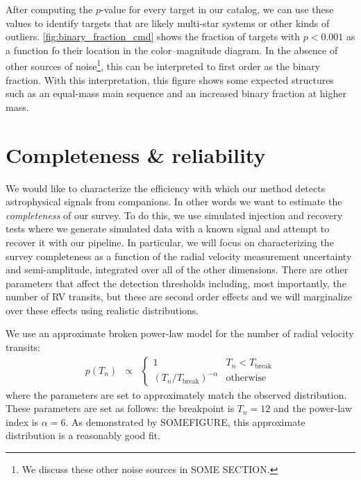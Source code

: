 \documentclass[modern, letterpaper]{aastex631}
\newcommand{\project}[1]{\textsl{#1}}
\newcommand{\Gaia}{\project{Gaia}}
\begin{document}
After computing the $p$-value for every target in our catalog, we can use these values to identify targets that are likely multi-star systems or other kinds of outliers.
\autoref{fig:binary_fraction_cmd} shows the fraction of targets with $p < 0.001$ as a function fo their location in the color--magnitude diagram.
In the absence of other sources of noise\footnote{We discuss these other noise sources in SOME SECTION.}, this can be interpreted to first order as the binary fraction.
With this interpretation, this figure shows some expected structures such as an equal-mass main sequence and an increased binary fraction at higher mass.


\section{Completeness \& reliability}

We would like to characterize the efficiency with which our method detects astrophysical signals from companions.
In other words we want to estimate the \emph{completeness} of our survey.
To do this, we use simulated injection and recovery tests where we generate simulated data with a known signal and attempt to recover it with our pipeline.
In particular, we will focus on characterizing the survey completeness as a function of the radial velocity measurement uncertainty and semi-amplitude, integrated over all of the other dimensions.
There are other parameters that affect the detection thresholds including, most importantly, the number of RV transits, but these are second order effects and we will marginalize over these effects using realistic distributions.

We use an approximate broken power-law model for the number of radial velocity transits:
\begin{eqnarray}
	\label{eq:nb-transits}
	p(T_n) &\propto& \left\{\begin{array}{ll}
	1                                  & T_n < T_\mathrm{break} \\
	(T_n / T_\mathrm{break})^{-\alpha} & \mathrm{otherwise}
	\end{array} \right.
\end{eqnarray}
where the parameters are set to approximately match the observed distribution.
These parameters are set as follows: the breakpoint is $T_n = 12$ and the power-law index is $\alpha = 6$.
As demonstrated by SOMEFIGURE, this approximate distribution is a reasonably good fit.
\end{document}
